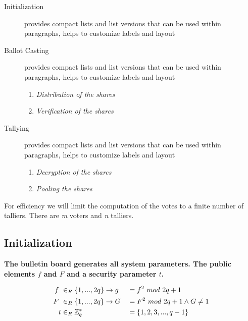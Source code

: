 \begin{description}
    \item[Initialization] provides compact lists and list versions
        that can be used within paragraphs, helps to customize
        labels and layout
    
    \item[Ballot Casting] provides compact lists and list versions
        that can be used within paragraphs, helps to customize
        labels and layout
    
    \begin{enumerate}
        \item \textit{Distribution of the shares}
        \item \textit{Verification of the shares}        
    \end{enumerate}
    
    
    \item[Tallying] provides compact lists and list versions
        that can be used within paragraphs, helps to customize
        labels and layout    
        
    \begin{enumerate}
        \item \textit{Decryption of the shares}
        \item \textit{Pooling the shares}        
    \end{enumerate}        

\end{description}
For efficiency we will limit the computation of the votes to a finite number of talliers. There are \textit{m} voters and \textit{n} talliers. 
\subsection{Initialization}

\noindent
\textbf{The bulletin board generates all system parameters. The public elements $f$ and $F$ and a security parameter $t$.}


\begin{alignat*}{2}
f \ &\in_R \{1,...,2q\} \rightarrow g &&= f^2 \ mod\ 2q+1\\
F \ &\in_R \{1,...,2q\}\rightarrow G &&= F^2 \ mod\ 2q+1 \wedge G\neq1\\
t &\in_R \mathbb{Z}_q^* &&= \{1,2,3,...,q-1\} 
\end{alignat*}

